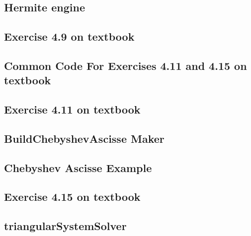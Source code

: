 \subsection{Hermite engine}
\label{subsec:hermiteEngineCode}


\subsection{Exercise 4.9 on textbook}
\label{subsec:exercise49}


\subsection{Common Code For Exercises 4.11 and 4.15 on textbook}
\label{subsec:commonFactorForExercises411415}


\subsection{Exercise 4.11 on textbook}
\label{subsec:exercise411}


\subsection{BuildChebyshevAscisse Maker}
\label{subsec:buildChebyshevAscisse}


\subsection{Chebyshev Ascisse Example}
\label{subsec:ChebyshevAscisseExample}


\subsection{Exercise 4.15 on textbook}
\label{subsec:exercise415}


\subsection{triangularSystemSolver}
\label{subsec:triangularSystemSolver}


